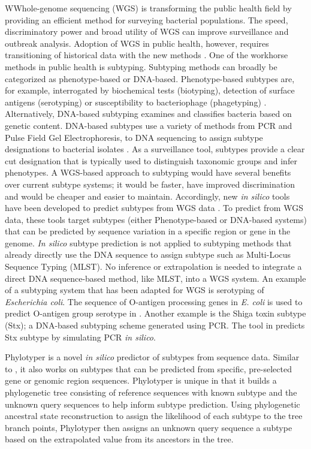 \documentclass{bioinfo}
\begin{document}
WWhole-genome sequencing (WGS) is transforming the public health field by providing an efficient method for surveying bacterial populations.
The speed, discriminatory power and broad utility of WGS can improve surveillance and outbreak analysis.
Adoption of WGS in public health, however, requires transitioning of historical data with the new methods \citep{Jenkins2015}.
One of the workhorse methods in public health is subtyping.
Subtyping methods can broadly be categorized as phenotype-based or DNA-based.
Phenotype-based subtypes are, for example, interrogated by biochemical tests (biotyping), detection of surface antigens (serotyping) or susceptibility to bacteriophage (phagetyping) \citep{Wiedmann2002}.
Alternatively, DNA-based subtyping examines and classifies bacteria based on genetic content. DNA-based subtypes use a variety of methods from PCR and Pulse Field Gel Electrophoresis, to DNA sequencing to assign subtype designations to bacterial isolates \citep{Wiedmann2002}.
As a surveillance tool, subtypes provide a clear cut designation that is typically used to distinguish taxonomic groups and infer phenotypes.
A WGS-based approach to subtyping would have several benefits over current subtype systems; it would be faster, have improved discrimination and would be cheaper and easier to maintain\citep{Jenkins2015}.
Accordingly, new \textit{in silico} tools have been developed to predict subtypes from WGS data \citep{Joensen2015,Ingle2016,CARRILLO2016}.
To predict from WGS data, these tools target subtypes (either Phenotype-based or DNA-based systems) that can be predicted by sequence variation in a specific region or gene in the genome.
\textit{In silico} subtype prediction is not applied to subtyping methods that already directly use the DNA sequence to assign subtype such as Multi-Locus Sequence Typing (MLST). 
No inference or extrapolation is needed to integrate a direct DNA sequence-based method, like MLST, into a WGS system.
An example of a subtyping system that has been adapted for WGS is serotyping of \textit{Escherichia coli}.
The sequence of O-antigen processing genes in \textit{E. coli} is used to predict O-antigen group serotype in \citep{Joensen2015,Ingle2016}.
Another example is the Shiga toxin subtype (Stx); a DNA-based subtyping scheme generated using PCR.
The tool in \citep{CARRILLO2016} predicts Stx subtype by simulating PCR \textit{in silico}.

Phylotyper is a novel \textit{in silico} predictor of subtypes from sequence data.
Similar to \citep{Joensen2015,Ingle2016,CARRILLO2016}, it also works on subtypes that can be predicted from specific, pre-selected gene or genomic region sequences.
Phylotyper is unique in that it builds a phylogenetic tree consisting of reference sequences with known subtype and the unknown query sequences to help inform subtype prediction.
Using phylogenetic ancestral state reconstruction to assign the likelihood of each subtype to the tree branch points, Phylotyper then assigns an unknown query sequence a subtype based on the extrapolated value from its ancestors in the tree.
\end{document}
